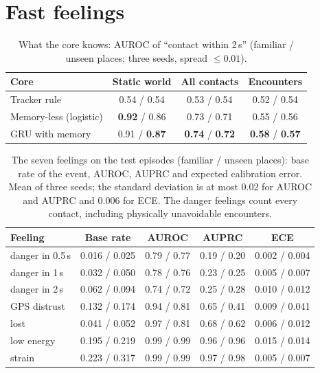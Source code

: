 \documentclass[10pt]{article}
\begin{document}
\section{Fast feelings}\label{sec:fast}
\begin{table}[t]
\centering\small
\caption{What the core knows: AUROC of ``contact within 2\,s'' (familiar / unseen places; three seeds, spread $\le0.01$).}
\label{tab:auroc}
\begin{tabular}{@{}lccc@{}}
\toprule
Core & Static world & All contacts & Encounters \\
\midrule
Tracker rule & 0.54 / 0.54 & 0.53 / 0.54 & 0.52 / 0.54 \\
Memory-less (logistic) & \textbf{0.92} / 0.86 & 0.73 / 0.71 & 0.55 / 0.56 \\
GRU with memory & 0.91 / \textbf{0.87} & \textbf{0.74} / \textbf{0.72} & \textbf{0.58} / \textbf{0.57} \\
\bottomrule
\end{tabular}
\end{table}

\begin{table}[t]
\centering\small
\caption{The seven feelings on the test episodes (familiar / unseen places): base rate of the event, AUROC, AUPRC and expected
calibration error. Mean of three seeds; the standard deviation is at most 0.02 for AUROC and AUPRC and 0.006 for ECE. The danger
feelings count every contact, including physically unavoidable encounters.}
\label{tab:feelings}
\setlength{\tabcolsep}{4pt}
\begin{tabular}{@{}lcccc@{}}
\toprule
Feeling & Base rate & AUROC & AUPRC & ECE \\
\midrule
danger in 0.5\,s & 0.016 / 0.025 & 0.79 / 0.77 & 0.19 / 0.20 & 0.002 / 0.004 \\
danger in 1\,s & 0.032 / 0.050 & 0.78 / 0.76 & 0.23 / 0.25 & 0.005 / 0.007 \\
danger in 2\,s & 0.062 / 0.094 & 0.74 / 0.72 & 0.25 / 0.28 & 0.010 / 0.012 \\
GPS distrust & 0.132 / 0.174 & 0.94 / 0.81 & 0.65 / 0.41 & 0.009 / 0.041 \\
lost & 0.041 / 0.052 & 0.97 / 0.81 & 0.68 / 0.62 & 0.006 / 0.012 \\
low energy & 0.195 / 0.219 & 0.99 / 0.99 & 0.96 / 0.96 & 0.015 / 0.014 \\
strain & 0.223 / 0.317 & 0.99 / 0.99 & 0.97 / 0.98 & 0.005 / 0.007 \\
\bottomrule
\end{tabular}
\end{table}
\end{document}
